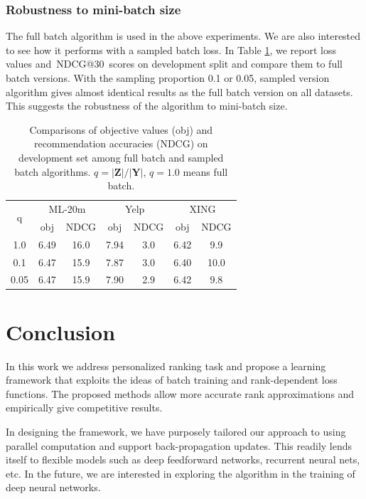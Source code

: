 \documentclass[letterpaper]{article} %
\makeatletter
\newcommand{\ndcg}{{\textsc{NDCG@30}}}
\newcommand{\xing}{\textsf{XING}}
\newcommand{\yelp}{\textsf{Yelp}}
\newcommand{\movietwenty}{\textsf{ML-20m}}
\makeatother
\begin{document}
\subsubsection{Robustness to mini-batch size}

The full batch algorithm is used in the above experiments. We are also interested to see how it performs with a sampled batch loss. In Table \ref{t:sampled}, we report loss values and~\ndcg~scores on development split and compare them to full batch versions. With the sampling proportion 0.1 or 0.05, sampled version algorithm gives almost identical results as the full batch version on all datasets. This suggests the robustness of the algorithm to mini-batch size.

\begin{table}
\centering
\begin{tabular} { |c|| c | c | c | c| c|c|} \hline
 \multirow{ 2}{*}{q}	         & \multicolumn{2}{|c|}{\movietwenty}  & \multicolumn{2}{|c|}{\yelp} & \multicolumn{2}{|c|}{\xing}  \\ \cline{2-7}
                  &  obj & \small{NDCG} & obj & \small{NDCG} & obj & \small{NDCG} \\ \hline
1.0    & 6.49 & 16.0  & 7.94 & 3.0   &  6.42  & 9.9\\ \hline
0.1  & 6.47 & 15.9    & 7.87  & 3.0  & 6.40  & 10.0 \\ \hline
0.05    & 6.47 & 15.9    & 7.90   &2.9  & 6.42  & 9.8\\ \hline
\end{tabular}
\caption{Comparisons of objective values (obj) and recommendation accuracies (NDCG) on development set among full batch and sampled batch algorithms. $q=|\textbf{Z}|/|\textbf{Y}|$, $q=1.0$ means full batch.} \label{t:sampled}
\end{table}

\section{Conclusion}

In this work we address personalized ranking task and propose a learning framework that exploits the ideas of batch training and rank-dependent loss functions. The proposed methods allow more accurate rank approximations and empirically give competitive results.

In designing the framework, we have purposely tailored our approach to using parallel computation and support back-propagation updates. This readily lends itself to flexible models such as deep feedforward networks, recurrent neural nets, etc. In the future, we are interested in exploring the algorithm in the training of deep neural networks.
\end{document}
